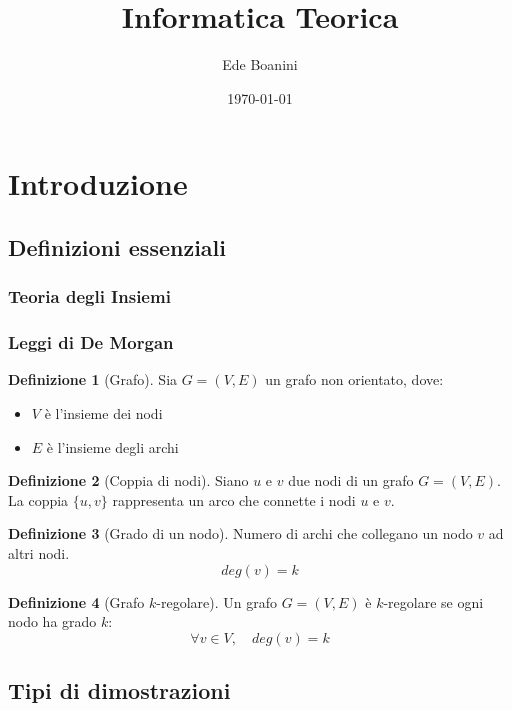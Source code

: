 \documentclass{article}  %
\title{Informatica Teorica}
\author{Ede Boanini}
\date{\today}
\theoremstyle{definition}
\newtheorem{definition}{Definizione}[section]
\begin{document}
\maketitle
\tableofcontents %
\newpage
\section{Introduzione}
\subsection{Definizioni essenziali}
\subsubsection{Teoria degli Insiemi}
\subsubsection{Leggi di De Morgan}
\begin{definition}[Grafo]
	Sia \(G=(V,E)\) un grafo non orientato, dove:
	\begin{itemize}
		\item \(V\) è l'insieme dei nodi
		\item \(E\) è l'insieme degli archi
	\end{itemize}
\end{definition}
\begin{definition}[Coppia di nodi]
	Siano \(u\) e \(v\) due nodi di un grafo \(G = (V,E)\).
	La coppia \(\{u,v\}\) rappresenta un arco che connette i nodi \(u\) e \(v\).
\end{definition}
\begin{definition}[Grado di un nodo]
	Numero di archi che collegano un nodo $v$ ad altri nodi.
	\[
		deg(v)=k
	\]
\end{definition}
\begin{definition}[Grafo $k$-regolare]
	Un grafo \(G=(V,E)\) è $k$-regolare se ogni nodo ha grado $k$:
	\[
		\forall v \in V, \quad deg(v)=k
	\]
\end{definition}
\subsection{Tipi di dimostrazioni}
\end{document}
